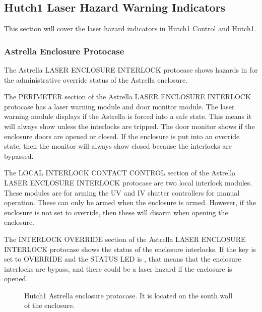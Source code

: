 \documentclass[letterpaper,10pt,english]{sphinxmanual}
\begin{document}
\subsection{Hutch\sphinxhyphen{}1 Laser Hazard Warning Indicators}
\label{\detokenize{user_documentation/Hutch-1_laser:hutch-1-laser-hazard-warning-indicators}}
\sphinxAtStartPar
This section will cover the laser hazard indicators in Hutch\sphinxhyphen{}1 Control and Hutch\sphinxhyphen{}1.


\subsubsection{Astrella Enclosure Protocase}
\label{\detokenize{user_documentation/Hutch-1_laser:astrella-enclosure-protocase}}
\sphinxAtStartPar
The Astrella LASER ENCLOSURE INTERLOCK protocase shows hazards in for the administrative override status of the Astrella enclosure.

\sphinxAtStartPar
The PERIMETER section of the Astrella LASER ENCLOSURE INTERLOCK protocase has a laser warning module and door monitor module.
The laser warning module displays if the Astrella is forced into a safe state. This means it will always show  unless the interlocks are tripped.
The door monitor shows if the enclosure doors are opened or closed. If the enclosure is put into an override state, then the monitor will always show closed because the interlocks are bypassed.

\sphinxAtStartPar
The LOCAL INTERLOCK CONTACT CONTROL section of the Astrella LASER ENCLOSURE INTERLOCK protocase are two local interlock modules.
These modules are for arming the UV and IV shutter controllers for manual operation.
These can only be armed when the enclosure is armed. However, if the enclosure is not set to override, then these will disarm when opening the enclosure.

\sphinxAtStartPar
The INTERLOCK OVERRIDE section of the Astrella LASER ENCLOSURE INTERLOCK protocase shows the status of the enclosure interlocks.
If the key is set to OVERRIDE and the STATUS LED is , that means that the enclosure interlocks are bypass, and there could be a laser hazard if the enclosure is opened.

\begin{figure}[htbp]
\centering
\capstart

\noindent{}
\caption{ Hutch\sphinxhyphen{}1 Astrella enclosure protocase.
It is located on the south wall of the enclosure.}\label{\detokenize{user_documentation/Hutch-1_laser:id1}}\end{figure}
\end{document}
